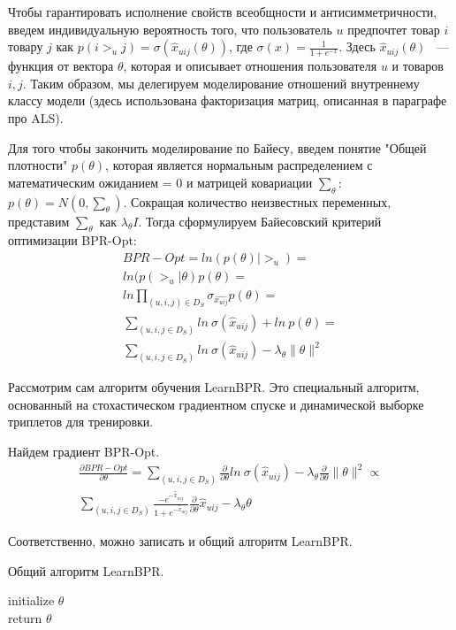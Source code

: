 \documentclass[14pt]{mmcs_article}
\begin{document}
Чтобы гарантировать исполнение свойств всеобщности и антисимметричности, введем индивидуальную вероятность того, что пользователь $ u $ предпочтет товар $ i $ товару $ j $ как $p(i >_u j) = \sigma(\hat{x}_{uij}(\theta))$, где $\sigma(x) = \frac{1}{1+e^{-x}}$. Здесь $ \hat{x}_{uij}(\theta) $ ~--- функция от вектора $\theta$, которая и описывает отношения пользователя $u$ и товаров $ i,j $. Таким образом, мы делегируем моделирование отношений внутреннему классу модели (здесь использована факторизация матриц, описанная в параграфе про ALS).  

Для того чтобы закончить моделирование по Байесу, введем понятие "Общей плотности" $ p(\theta) $, которая является нормальным распределением с математическим ожиданием = 0 и матрицей ковариации $ \sum_{\theta} $: $p(\theta) = N(0,\sum_{\theta})$.
Сокращая количество неизвестных переменных, представим $ \sum_{\theta} $ как $ \lambda_{\theta} I $. Тогда сформулируем Байесовский критерий оптимизации BPR-Opt:
\begin{equation}
	\begin{split}
		BPR-Opt = ln(p(\theta) |  >_u) = \\
		ln(p(>_u | \theta)p(\theta)	= \\
		ln \prod_{(u,i,j) \in D_S} \sigma_{\hat{x_{uij}}}p(\theta) = \\ 
		\sum_{(u,i,j \in D_S)}ln \ \sigma(\hat{x}_{uij}) + ln \  p(\theta) = \\
		\sum_{(u,i,j \in D_S)}ln \ \sigma(\hat{x}_{uij}) - \lambda_{\theta} \parallel \theta \parallel ^ 2
	\end{split}
\end{equation}

Рассмотрим сам алгоритм обучения LearnBPR. Это специальный алгоритм, основанный на стохастическом градиентном спуске и динамической выборке триплетов для тренировки.

Найдем градиент BPR-Opt.
\begin{multline}
	\frac{\partial BPR-Opt}{\partial \theta} = \sum_{(u,i,j \in D_S)} \frac{\partial}{\partial \theta} ln \ \sigma(\hat{x}_{uij}) - \lambda_{\theta} \frac{\partial}{\partial \theta} \parallel \theta \parallel ^ 2 \propto \\
	 \sum_{(u,i,j \in D_S)} \frac{- e^{-\hat{x}_{uij}}}{1 + e^{-\hat{x}_{uij}}} \frac{\partial}{\partial \theta} \hat{x}_{uij} - \lambda_{\theta} \theta
\end{multline}

Соответственно, можно записать и общий алгоритм LearnBPR.\\
\begin{algorithm}[H]\label{bpr:1}
	\caption{Общий алгоритм LearnBPR.}
	\KwOut{$\theta$}
	initialize $\theta$ \\
	return $\theta$
\end{algorithm}
\end{document}
